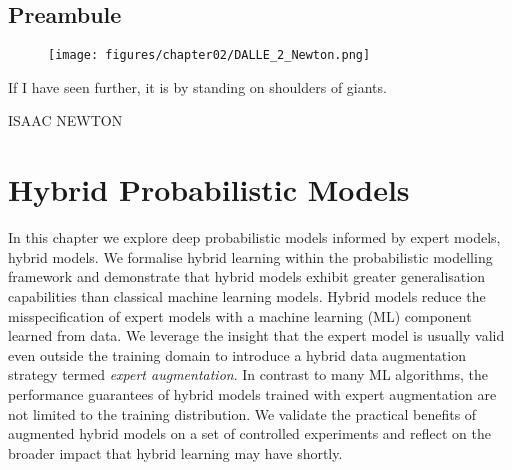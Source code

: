 \thispagestyle{empty}
\section*{Preambule}

\vfill

\begin{figure}[h]
  \centering

  \texttt{[image: figures/chapter02/DALLE\_2\_Newton.png]}
  \label{}
\end{figure}

{\centering
\parbox{\textwidth}{%
  \raggedright
  {%

   If I have seen further, it is by standing on shoulders of giants.\par\bigskip
  }
  \raggedleft\MakeUppercase{Isaac Newton}\par%
}}

\vfill\vfill

\chapter{Hybrid Probabilistic Models}\label{ch:07}

\begin{chapter_outline}

In this chapter we explore deep probabilistic models informed by expert models, hybrid models.
We formalise hybrid learning within the probabilistic modelling framework and demonstrate that hybrid models exhibit greater generalisation capabilities than classical machine learning models.
Hybrid models reduce the misspecification of expert models with a machine learning (ML) component learned from data. We leverage the insight that the expert model is usually valid even outside the training domain to introduce a hybrid data augmentation strategy termed \textit{expert augmentation}. In contrast to many ML algorithms, the performance guarantees of hybrid models trained with expert augmentation are not limited to the training distribution. We validate the practical benefits of augmented hybrid models on a set of controlled experiments and reflect on the broader impact that hybrid learning may have shortly.

\end{chapter_outline}

